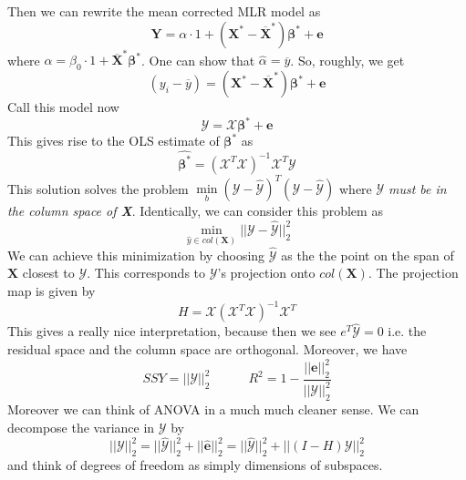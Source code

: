 \documentclass[12pt]{article}  %
\newcommand{\bb}{{\boldsymbol{\beta}}}
\begin{document}
Then we can rewrite the mean corrected MLR model as \begin{equation}\mathbf{Y} = \alpha\cdot1 + (\mathbf{X}^{*} - \overline{\mathbf{X}}^{*})\bb^{*} + \mathbf{e}\end{equation} where $\alpha = \beta_0\cdot1 +\overline{\mathbf{X}}^{*}\bb^{*}$. One can show that $\widehat{\alpha} = \overline{y}$. So, roughly, we get \begin{equation}(y_i - \overline{y}) = (\mathbf{X}^{*} - \overline{\mathbf{X}}^{*})\bb^{*} + \mathbf{e}\end{equation}Call this model now \begin{equation}\mathcal{Y} = \mathcal{X}\bb^{*} + \mathbf{e}\end{equation} This gives rise to the OLS estimate of $\bb^{*}$ as $$\widehat{\bb^{*}} = (\mathcal{X}^{T}\mathcal{X})^{-1}\mathcal{X}^{T}\mathcal{Y}$$ This solution solves the problem $\underset{b}{\min}(\mathcal{Y} - \widehat{\mathcal{Y}})^{T}(\mathcal{Y} - \widehat{\mathcal{Y}})$ where $\mathcal{Y}$ \textit{must be in the column space of \textbf{X}}. Identically, we can consider this problem as \begin{equation}
\underset{\widehat{y}\in col(\mathbf{X})}{\min}||\mathcal{Y} - \widehat{\mathcal{Y}}||_2^2
\end{equation} We can achieve this minimization by choosing $\widehat{\mathcal{Y}}$ as the the point on the span of $\mathbf{X}$ closest to $\mathcal{Y}$. This corresponds to $\mathcal{Y}$'s projection onto $col(\mathbf{X})$. The projection map is given by \begin{equation}H = \mathcal{X}(\mathcal{X}^{T}\mathcal{X})^{-1}\mathcal{X}^{T}\end{equation} This gives a really nice interpretation, because then we see $e^{T}\widehat{\mathcal{Y}} = 0$ i.e. the residual space and the column space are orthogonal. Moreover, we have $$SSY = ||\mathcal{Y}||_2^2\hspace{3em} R^2 = 1 - \frac{||\mathbf{e}||_2^2}{||\mathcal{Y}||_2^2}$$ Moreover we can think of ANOVA in a much much cleaner sense. We can decompose the variance in $\mathcal{Y}$ by $$||\mathcal{Y}||_2^2 = ||\widehat{\mathcal{Y}}||_2^2 + ||\widehat{\mathbf{e}}||_2^2 = ||\widehat{\mathcal{Y}}||_2^2 + ||(I-H)\mathcal{Y}||_2^2$$ and think of degrees of freedom as simply dimensions of subspaces. 
\end{document}
